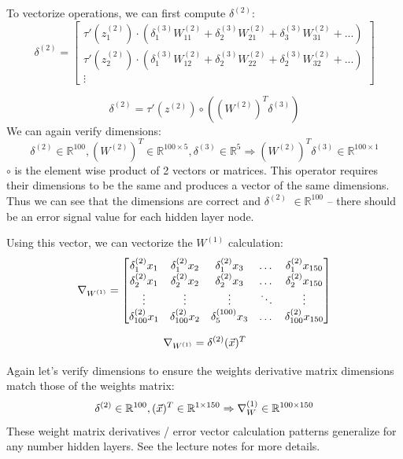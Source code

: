 \documentclass[]{article}
\newcommand{\slayer}[3]{ %
	\ensuremath{{#1}^{(#2)}_{#3}}}
\newcommand{\vlayer}[2]{ %
	\ensuremath{{#1}^{(#2)}}}
\newcommand{\reals}[1]{ %
	\ensuremath{\in \mathbb{R}^{#1}}}
\begin{document}
To vectorize operations, we can first compute\vlayer{\delta}{2}:
\[
\vlayer{\delta}{2} = 
\begin{bmatrix}
\tau'(\slayer{z}{2}{1}) \cdot (\slayer{\delta}{3}{1}\slayer{W}{2}{11} + \slayer{\delta}{3}{2}\slayer{W}{2}{21} + \slayer{\delta}{3}{3}\slayer{W}{2}{31} + ... ) \\
\tau'(\slayer{z}{2}{2}) \cdot (\slayer{\delta}{3}{1}\slayer{W}{2}{12} + \slayer{\delta}{3}{2}\slayer{W}{2}{22} + \slayer{\delta}{3}{2}\slayer{W}{2}{32} + ... ) \\
\vdots 
\end{bmatrix}
\]

\begin{equation}\label{eq:d2}
	\vlayer{\delta}{2} = \tau'(\vlayer{z}{2}) \circ \left((\vlayer{W}{2})^T\vlayer{\delta}{3}\right)
\end{equation}
We can again verify dimensions:
$$\vlayer{\delta}{2}\reals{100},(\vlayer{W}{2})^T\reals{100\times5},\vlayer{\delta}{3}\reals{5}\Rightarrow(\vlayer{W}{2})^T\vlayer{\delta}{3}\reals{100\times1}$$
$\circ$ is the element wise product of 2 vectors or matrices. This operator requires their dimensions to be the same and produces a vector of the same dimensions. Thus we can see that the dimensions are correct and\vlayer{\delta}{2}\reals{100} -- there should be an error signal value for each hidden layer node.

Using this vector, we can vectorize the \vlayer{W}{1} calculation:
\[
\nabla_{\vlayer{W}{1}} = 
\begin{bmatrix}
\slayer{\delta}{2}{1}x_1       & \slayer{\delta}{2}{1}x_2 & \slayer{\delta}{2}{1}x_3 & \dots & \slayer{\delta}{2}{1}x_{150} \\
\slayer{\delta}{2}{2}x_1       & \slayer{\delta}{2}{2}x_2 & \slayer{\delta}{2}{2}x_3 & \dots & \slayer{\delta}{2}{2}x_{150} \\
\vdots	& \vdots	&\vdots	&\ddots	& \vdots \\
\slayer{\delta}{2}{100}x_1       & \slayer{\delta}{2}{100}x_2 & \slayer{\delta}{100}{5}x_3 & \dots & \slayer{\delta}{2}{100}x_{150} \\
\end{bmatrix}
\]

\begin{equation}\label{eq:W1}
	\nabla_{\vlayer{W}{1}} = \vlayer{\delta}{2}(\vec{x})^T
\end{equation}

Again let's verify dimensions to ensure the weights derivative matrix dimensions match those of the weights matrix:
$$\vlayer{\delta}{2}\reals{100},(\vec{x})^T\reals{1\times150}\Rightarrow\nabla_\vlayer{W}{1}\reals{100\times150}$$
These weight matrix derivatives / error vector calculation patterns generalize for any number hidden layers. See the lecture notes for more details.
\end{document}

